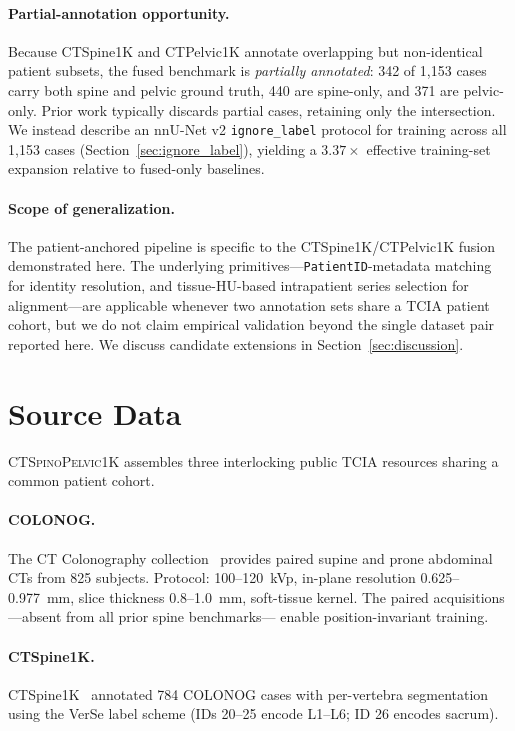 \documentclass[pmlr]{jmlr}
\newcommand{\dataset}{\textsc{CTSpinoPelvic1K}}
\begin{document}
\paragraph{Partial-annotation opportunity.}
Because CTSpine1K and CTPelvic1K annotate overlapping but
non-identical patient subsets, the fused benchmark is
\emph{partially annotated}: 342 of 1{,}153 cases carry both spine
and pelvic ground truth, 440 are spine-only, and 371 are pelvic-only.
Prior work typically discards partial cases, retaining only the
intersection. We instead describe an nnU-Net v2
\texttt{ignore\_label} protocol for training across all 1{,}153
cases (Section~\ref{sec:ignore_label}), yielding a $3.37\times$
effective training-set expansion relative to fused-only baselines.

\paragraph{Scope of generalization.}
The patient-anchored pipeline is specific to the CTSpine1K/CTPelvic1K
fusion demonstrated here. The underlying primitives---\texttt{PatientID}-metadata
matching for identity resolution, and tissue-HU-based
intrapatient series selection for alignment---are applicable
whenever two annotation sets share a TCIA patient cohort, but we
do not claim empirical validation beyond the single dataset pair
reported here. We discuss candidate extensions in
Section~\ref{sec:discussion}.

\section{Source Data}
\label{sec:source}

\dataset{} assembles three interlocking public TCIA resources
sharing a common patient cohort.

\paragraph{COLONOG.}
The CT Colonography collection~\citep{Smith2015DataCOLONOGRAPHY} provides
paired supine and prone abdominal CTs from 825 subjects.
Protocol: 100--120~kVp, in-plane resolution 0.625--0.977~mm, slice
thickness 0.8--1.0~mm, soft-tissue kernel.
The paired acquisitions---absent from all prior spine benchmarks---
enable position-invariant training.

\paragraph{CTSpine1K.}
CTSpine1K~\citep{Deng2021CTSpine1K:Tomography} annotated 784 COLONOG cases with
per-vertebra segmentation using the VerSe label scheme
(IDs 20--25 encode L1--L6; ID 26 encodes sacrum).
\end{document}
